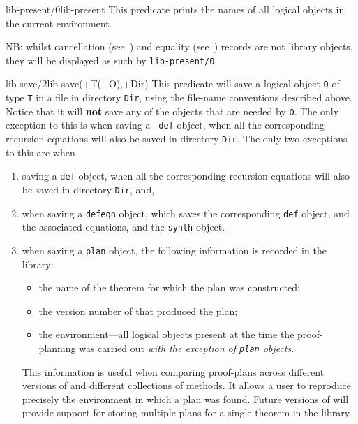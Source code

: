\begin{predicate}{lib-present/0}{lib-present}%
This predicate prints the names of all logical objects in the current
environment.  

NB: whilst cancellation (see~) and equality
(see~) records are not library objects, they will be
displayed as such by {\tt lib-present/0}.

\end{predicate}

\begin{predicate}{lib-save/2}{lib-save(+T(+O),+Dir)}%
This predicate will save a logical object {\tt O} of type {\tt T} in a
file in directory {\tt Dir}, using the file-name conventions described
above. Notice that it will {\bf not} save any of the objects that are
needed by {\tt O}. The only exception to this is when saving a {\tt
def} object, when all the corresponding recursion equations will also
be saved in directory {\tt Dir}. The only two exceptions to this are
when
\begin{enumerate}
\item  saving a {\tt def} object, when all the corresponding recursion
equations will also be saved in directory {\tt Dir}, and,

\item  when saving a {\tt defeqn} object, which saves the
corresponding {\tt def} object, and the associated equations, and the
{\tt synth} object. 

\item when saving a {\tt plan} object, the following information is
recorded in the library:
        \begin{itemize}
        \item the name of the theorem for which the plan was
              constructed;
        \item the version number of \clam{} that produced the plan; 
        \item the \clam{} environment---all logical objects present at
              the time the proof-planning was carried out {\em with
              the exception of {\tt plan} objects}.
        \end{itemize}
This information is useful when comparing proof-plans across different
versions of \clam{} and different collections of methods.  It allows a
user to reproduce precisely the environment in which a plan was found.
Future versions of \clam{} will provide support for storing multiple
plans for a single theorem in the library.
\end{enumerate}


\end{predicate}
